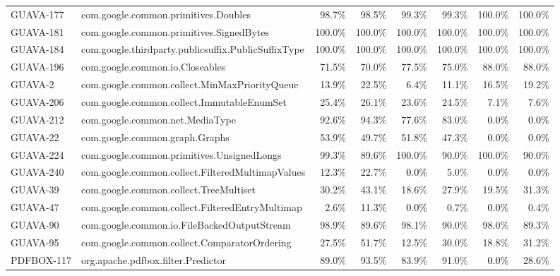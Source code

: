 \begin{tabular}{ ll rr rr rr}
GUAVA-177  &  com.google.common.primitives.Doubles & 98.7\% & 98.5\% & 99.3\% & 99.3\% & 100.0\% & 100.0\%\\ 
GUAVA-181  &  com.google.common.primitives.SignedBytes & 100.0\% & 100.0\% & 100.0\% & 100.0\% & 100.0\% & 100.0\%\\ 
GUAVA-184  &  com.google.thirdparty.publicsuffix.PublicSuffixType & 100.0\% & 100.0\% & 100.0\% & 100.0\% & 100.0\% & 100.0\%\\ 
GUAVA-196  &  com.google.common.io.Closeables & 71.5\% & 70.0\% & 77.5\% & 75.0\% & 88.0\% & 88.0\%\\ 
GUAVA-2  &  com.google.common.collect.MinMaxPriorityQueue & 13.9\% & 22.5\% & 6.4\% & 11.1\% & 16.5\% & 19.2\%\\ 
GUAVA-206  &  com.google.common.collect.ImmutableEnumSet & 25.4\% & 26.1\% & 23.6\% & 24.5\% & 7.1\% & 7.6\%\\ 
GUAVA-212  &  com.google.common.net.MediaType & 92.6\% & 94.3\% & 77.6\% & 83.0\% & \cellcolor{light-gray} \textcolor{black}{0.0\%} & \cellcolor{light-gray} \textcolor{black}{0.0\%}\\ 
GUAVA-22  &  com.google.common.graph.Graphs & 53.9\% & 49.7\% & 51.8\% & 47.3\% & \cellcolor{light-gray} \textcolor{black}{0.0\%} & \cellcolor{light-gray} \textcolor{black}{0.0\%}\\ 
GUAVA-224  &  com.google.common.primitives.UnsignedLongs & 99.3\% & 89.6\% & 100.0\% & 90.0\% & 100.0\% & 90.0\%\\ 
GUAVA-240  &  com.google.common.collect.FilteredMultimapValues & 12.3\% & 22.7\% & \cellcolor{light-gray} \textcolor{black}{0.0\%} & 5.0\% & \cellcolor{light-gray} \textcolor{black}{0.0\%} & \cellcolor{light-gray} \textcolor{black}{0.0\%}\\ 
GUAVA-39  &  com.google.common.collect.TreeMultiset & 30.2\% & 43.1\% & 18.6\% & 27.9\% & 19.5\% & 31.3\%\\ 
GUAVA-47  &  com.google.common.collect.FilteredEntryMultimap & 2.6\% & 11.3\% & \cellcolor{light-gray} \textcolor{black}{0.0\%} & 0.7\% & \cellcolor{light-gray} \textcolor{black}{0.0\%} & 0.4\%\\ 
GUAVA-90  &  com.google.common.io.FileBackedOutputStream & 98.9\% & 89.6\% & 98.1\% & 90.0\% & 98.0\% & 89.3\%\\ 
GUAVA-95  &  com.google.common.collect.ComparatorOrdering & 27.5\% & 51.7\% & 12.5\% & 30.0\% & 18.8\% & 31.2\%\\ 
PDFBOX-117  &  org.apache.pdfbox.filter.Predictor & 89.0\% & 93.5\% & 83.9\% & 91.0\% & \cellcolor{light-gray} \textcolor{black}{0.0\%} & 28.6\%\\ 

\end{tabular}
